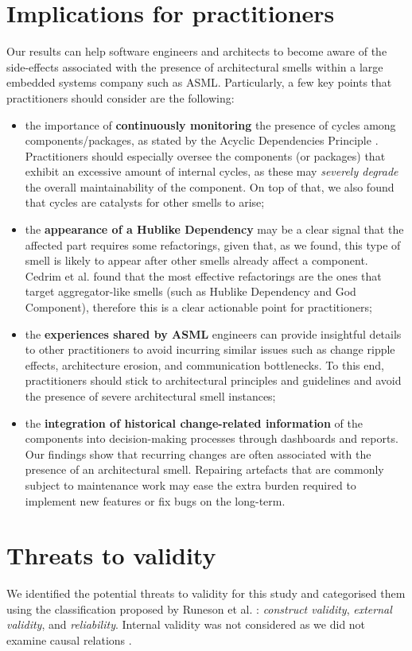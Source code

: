 \section{Implications for practitioners}\label{c4:sec:implications}
Our results can help software engineers and architects to become aware of the side-effects associated with the presence of architectural smells within a large embedded systems company such as ASML.
Particularly, a few key points that practitioners should consider are the following:
\begin{itemize}
    \item the importance of \textbf{continuously monitoring} the presence of cycles among components/packages, as stated by the Acyclic Dependencies Principle \cite{Lippert2006}. Practitioners should especially oversee the components (or packages) that exhibit an excessive amount of internal cycles, as these may \emph{severely degrade} the overall maintainability of the component. On top of that, we also found that cycles are catalysts for other smells to arise;
    \item the \textbf{appearance of a Hublike Dependency} may be a clear signal that the affected part requires some refactorings, given that, as we found, this type of smell is likely to appear after other smells already affect a component.
    Cedrim et al. \cite{Cedrim2017} found that the most effective refactorings are the ones that target aggregator-like smells (such as Hublike Dependency and God Component), therefore this is a clear actionable point for practitioners;
    \item the \textbf{experiences shared by ASML} engineers can provide insightful details to other practitioners to avoid incurring similar issues such as change ripple effects, architecture erosion, and communication bottlenecks. To this end, practitioners should stick to architectural principles \cite{Martin2018} and guidelines and avoid the presence of severe architectural smell instances;
    \item the \textbf{integration of historical change-related information} of the components into decision-making processes through dashboards and reports. Our findings show that recurring changes are often associated with the presence of an architectural smell.
    Repairing artefacts that are commonly subject to maintenance work may ease the extra burden required to implement new features or fix bugs on the long-term.
\end{itemize}


\section{Threats to validity}\label{c4:sec:threats-to-validity}
We identified the potential threats to validity for this study and categorised them using the classification proposed by Runeson et al. \cite{Runeson2012}: \emph{construct validity}, \emph{external validity}, and \emph{reliability}.
Internal validity was not considered as we did not examine causal relations \cite{Runeson2012}.

